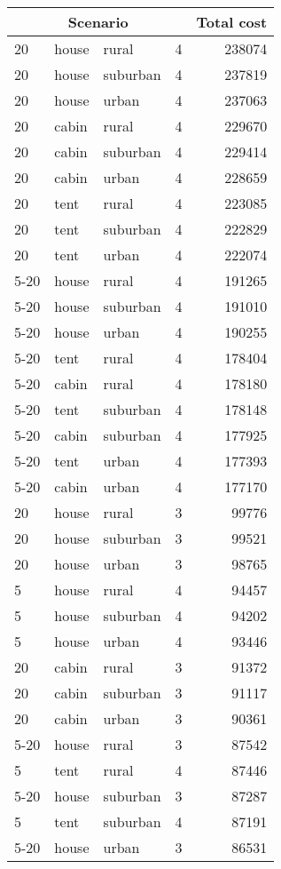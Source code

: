 
\begin{center}
\begin{longtable}{llllr}
\multicolumn{4}{c}{Scenario} & Total cost \\ \hline
20 & house & rural & 4 & 238074 \\
20 & house & suburban & 4 & 237819 \\
20 & house & urban & 4 & 237063 \\
20 & cabin & rural & 4 & 229670 \\
20 & cabin & suburban & 4 & 229414 \\
20 & cabin & urban & 4 & 228659 \\
20 & tent & rural & 4 & 223085 \\
20 & tent & suburban & 4 & 222829 \\
20 & tent & urban & 4 & 222074 \\
5-20 & house & rural & 4 & 191265 \\
5-20 & house & suburban & 4 & 191010 \\
5-20 & house & urban & 4 & 190255 \\
5-20 & tent & rural & 4 & 178404 \\
5-20 & cabin & rural & 4 & 178180 \\
5-20 & tent & suburban & 4 & 178148 \\
5-20 & cabin & suburban & 4 & 177925 \\
5-20 & tent & urban & 4 & 177393 \\
5-20 & cabin & urban & 4 & 177170 \\
20 & house & rural & 3 & 99776 \\
20 & house & suburban & 3 & 99521 \\
20 & house & urban & 3 & 98765 \\
5 & house & rural & 4 & 94457 \\
5 & house & suburban & 4 & 94202 \\
5 & house & urban & 4 & 93446 \\
20 & cabin & rural & 3 & 91372 \\
20 & cabin & suburban & 3 & 91117 \\
20 & cabin & urban & 3 & 90361 \\
5-20 & house & rural & 3 & 87542 \\
5 & tent & rural & 4 & 87446 \\
5-20 & house & suburban & 3 & 87287 \\
5 & tent & suburban & 4 & 87191 \\
5-20 & house & urban & 3 & 86531 \\

\end{longtable}
\end{center}
